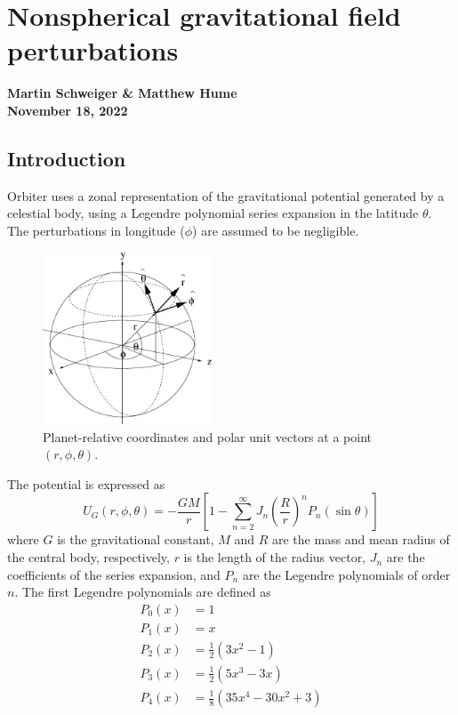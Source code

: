 \documentclass[Orbiter Technical Reference.tex]{subfiles}
\begin{document}
\section{Nonspherical gravitational field perturbations}
\textbf{Martin Schweiger \& Matthew Hume}\\
\textbf{November 18, 2022}


\subsection{Introduction}
Orbiter uses a zonal representation of the gravitational potential generated by a celestial body, using a Legendre polynomial series expansion in the latitude $\theta$. The perturbations in longitude ($\phi$) are assumed to be negligible.
\begin{figure}[H]\centering
\includegraphics[width=0.45\textwidth]{sphere.eps}
\caption{Planet-relative coordinates and polar unit vectors at a point $(r,\phi,\theta)$.}
\end{figure}
The potential is expressed as
\begin{equation}\label{eq:gpot}
U_G(r,\phi,\theta) = -\frac{GM}{r} \left[ 1 - \sum_{n=2}^\infty J_n \left(\frac{R}{r}\right)^n P_n(\sin \theta) \right]
\end{equation}
where $G$ is the gravitational constant, $M$ and $R$ are the mass and mean radius of the central body, respectively, $r$ is the length of the radius vector, $J_n$ are the coefficients of the series expansion, and $P_n$ are the Legendre polynomials of order $n$.
The first Legendre polynomials are defined as
\begin{equation}
\begin{split}
P_0(x) &= 1\\
P_1(x) &= x\\
P_2(x) &= \frac{1}{2}(3x^2 - 1)\\
P_3(x) &= \frac{1}{2}(5x^3 - 3x)\\
P_4(x) &= \frac{1}{8}(35x^4 - 30x^2 +3)
\end{split}
\end{equation}
\end{document}
